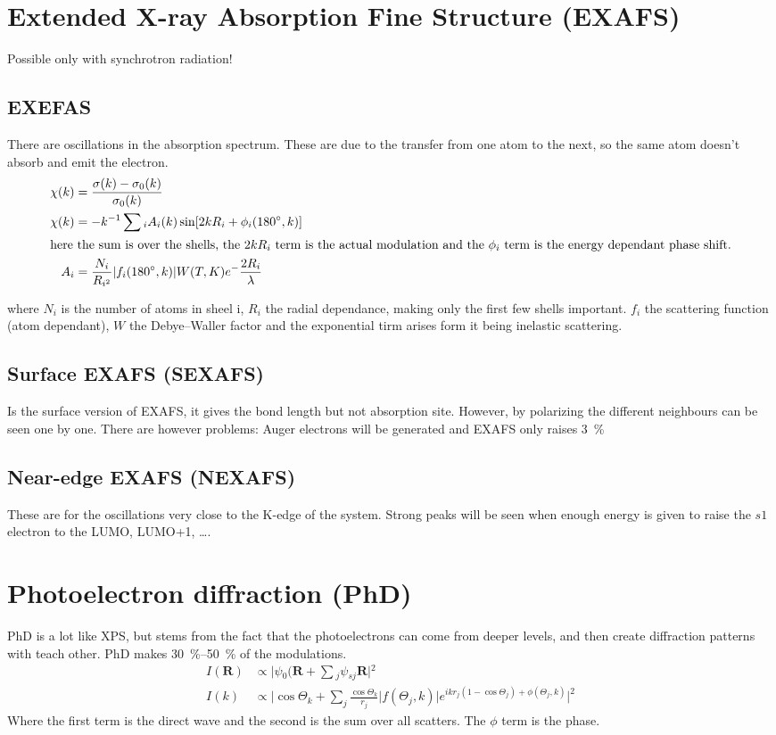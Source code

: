 \documentclass[article,oneside]{memoir}
\begin{document}
\chapter{Extended X-ray Absorption Fine Structure (EXAFS)}

Possible only with synchrotron radiation!
\section{EXEFAS}
There are oscillations in the absorption spectrum. These are due to the transfer from one atom to the next, so the same atom doesn't absorb and emit the electron.
\begin{align*}
        \chi(k)&=\frac{\sigma(k)-\sigma_{0}(k)}{\sigma_{0}(k)}\\
        \chi{}(k)&=-k^{-1}\sum{}_{i}A_{i}(k)\sin[2kR_{i}+\phi_{i}(180^\circ{},k)]\\
        \intertext{here the sum is over the shells, the $2kR_{i}$ term is the actual modulation and  the $\phi_{i}$ term is the energy dependant phase shift.}
        A_{i}&=\frac{N_i}{R_{i^2}}\lvert f_{i}(180^\circ,k)\rvert W(T,K)e^-\frac{2R_{i}}{\lambda}
\end{align*}

where $N_{i}$ is the number of atoms in sheel i, $R_{i}$ the radial dependance, making only the first few shells important. $f_{i}$ the scattering function (atom dependant), $W$ the Debye--Waller factor and the exponential tirm arises form it being inelastic scattering.
\section{Surface EXAFS (SEXAFS)}
Is the surface version of EXAFS, it gives the bond length but not absorption site. However, by polarizing the different neighbours can be seen one by one. There are however problems: Auger electrons will be generated and EXAFS only raises \SI{3}{\percent} 
\section{Near-edge EXAFS (NEXAFS)}
These are for the oscillations very close to the K-edge of the system. Strong peaks will be seen when enough energy is given to raise the $s1$ electron to the LUMO, LUMO+1, \dots.
\chapter{Photoelectron diffraction (PhD)}
PhD is a lot like XPS, but stems from the fact that the photoelectrons can come from deeper levels, and then create diffraction patterns with teach other. PhD makes \SIrange{30}{50}{\percent} of the modulations.
\begin{align*}
        I(\mathbf{R})&\propto{}\lvert{}\psi{}_{0}(\mathbf{R}+\sum{}_{j}\psi{}_{sj}\mathbf{R}\rvert{}^2\\
        I(k)&\propto\big\lvert\cos\Theta_{k}+\sum_j \frac{\cos\Theta_k}{r_{j}}\lvert f(\Theta_j,k)\rvert e^{ikr_{j}(1-\cos\Theta_j)+\phi(\Theta_j,k)}\big\rvert^2
\end{align*}
Where the first term is the direct wave and the second is the sum over all scatters. The $\phi$ term is the phase.
\end{document}
